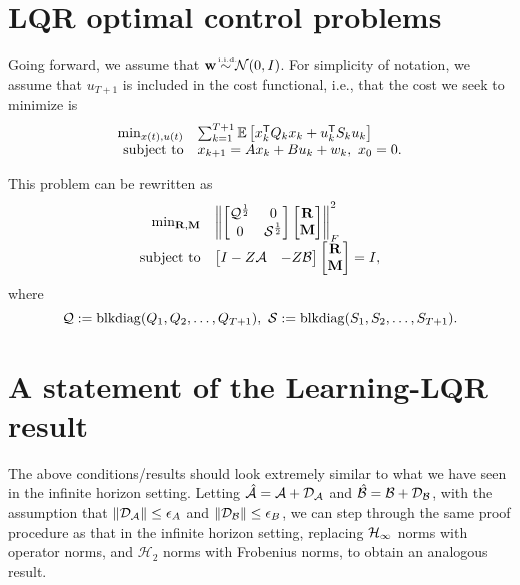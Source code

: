 \documentclass[11pt]{article}
\numberwithin{equation}{section}
\begin{document}
\section{LQR optimal control problems}
Going forward, we assume that $\tf w \iid \mathcal{N}(0,I)$.  For simplicity of notation, we assume that $u_{T+1}$ is included in the cost functional, i.e., that the cost we seek to minimize is
\begin{equation}
\begin{array}{rl}
\min_{x(t),u(t)} & \sum_{k=1}^{T+1} \mathbb{E}\left[x_k^{\mathsf{T}} Q_k x_k + u_k^{\mathsf{T}} S_ku_k\right] \\
\mbox{subject to} & x_{k+1} = Ax_k + Bu_k + w_k, \ x_0 = 0.
\end{array}
\label{eq:lqr_toep}
\end{equation}

This problem can be rewritten as
\begin{equation}
\begin{array}{rl}
\min_{\mathbf{R},\mathbf{M}} & \left\lVert \begin{bmatrix} \mathcal{Q}^{\frac{1}{2}} & 0 \\ 0 & \mathcal{S}^{\frac{1}{2}}\end{bmatrix}\begin{bmatrix}\mathbf{R} \\ \mathbf{M}\end{bmatrix} \right\rVert_F^2 \\
\mbox{subject to} & \begin{bmatrix} I - Z\mathcal{A} & -Z\mathcal{B} \end{bmatrix}\begin{bmatrix} \mathbf{R} \\ \mathbf{M} \end{bmatrix} = I,
\end{array}
\label{eq:lqr_compact}
\end{equation}
where
\begin{equation}
\mathcal{Q} := \mathrm{blkdiag}(Q_1,Q_2, \dots, Q_{T+1}), \ \mathcal{S} := \mathrm{blkdiag}(S_1,S_2, \dots, S_{T+1}).
\end{equation}

\section{A statement of the Learning-LQR result}
The above conditions/results should look extremely similar to what we have seen in the infinite horizon setting.  Letting $\hat{\mathcal{A}} = \mathcal{A} + \mathcal{D}_{\mathcal{A}}$ and $\hat{\mathcal{B}} = \mathcal{B} + \mathcal{D}_{\mathcal{B}}$, with the assumption that $\|\mathcal{D}_{\mathcal{A}}\| \leq \epsilon_A$ and $\|\mathcal{D}_{\mathcal{B}}\|\leq \epsilon_B$, we can step through the same proof procedure as that in the infinite horizon setting, replacing $\mathcal{H}_\infty$ norms with operator norms, and $\mathcal{H}_2$ norms with Frobenius norms, to obtain an analogous result.  
\end{document}
